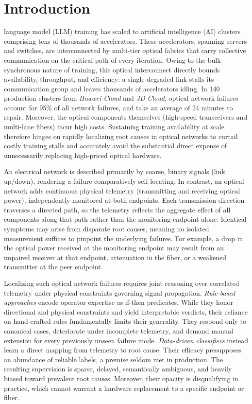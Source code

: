 \section{Introduction}\label{sec:introduction}

 language model (LLM) training has scaled to artificial intelligence (AI) clusters comprising tens of thousands of accelerators. 
These accelerators, spanning servers and switches, are interconnected by multi-tier optical fabrics that carry collective communication on the critical path of every iteration.
Owing to the bulk-synchronous nature of training, this optical interconnect directly bounds availability, throughput, and efficiency: a single degraded link stalls its communication group and leaves thousands of accelerators idling.
In 140 production clusters from \textit{Huawei Cloud} and \textit{JD Cloud}, optical network failures account for 95\% of all network failures, and take an average of 24 minutes to repair.
Moreover, the optical components themselves (\eg high-speed transceivers and multi-lane fibers) incur high costs.
Sustaining training availability at scale therefore hinges on rapidly localizing root causes in optical networks to curtail costly training stalls and accurately avoid the substantial direct expense of unnecessarily replacing high-priced optical hardware.


An electrical network is described primarily by coarse, binary signals (\eg link up/down), rendering a failure comparatively self-locating. 
In contrast, an optical network adds continuous physical telemetry (\eg transmitting and receiving optical power), independently monitored at both endpoints. 
Each transmission direction traverses a directed path, so the telemetry reflects the aggregate effect of all components along that path rather than the monitoring endpoint alone.
Identical symptoms may arise from disparate root causes, meaning no isolated measurement suffices to pinpoint the underlying failures.
For example, a drop in the optical power received at the monitoring endpoint may result from an impaired receiver at that endpoint, attenuation in the fiber, or a weakened transmitter at the peer endpoint. 

Localizing such optical network failures requires joint reasoning over correlated telemetry under physical constraints governing signal propagation. \textit{Rule-based approaches} encode operator expertise as if-then predicates. While they honor directional and physical constraints and yield interpretable verdicts, their reliance on hand-crafted rules fundamentally limits their generality. They respond only to canonical cases, deteriorate under incomplete telemetry, and demand manual extension for every previously unseen failure mode. \textit{Data-driven classifiers} instead learn a direct mapping from telemetry to root cause. Their efficacy presupposes an abundance of reliable labels, a premise seldom met in production. The resulting supervision is sparse, delayed, semantically ambiguous, and heavily biased toward prevalent root causes. Moreover, their opacity is disqualifying in practice, which cannot warrant a hardware replacement to a specific endpoint or fiber.

